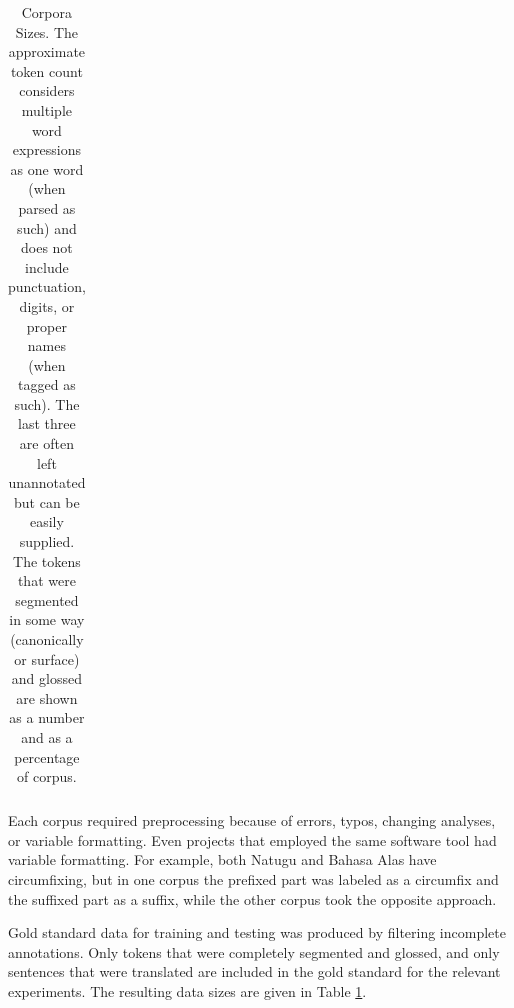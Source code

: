 \begin{table}[hb]
\begin{tabular}{l|r|rc}
    \end{tabular}
    \caption[Corpora Sizes]{Corpora Sizes. The approximate token count considers multiple word expressions as one word (when parsed as such) and does not include punctuation, digits, or proper names (when tagged as such). The last three are often left unannotated but can be easily supplied. The tokens that were segmented in some way (canonically or surface) and glossed are shown as a number and as a percentage of corpus.}
    \label{tab:goldstandard}
\end{table}


Each corpus required preprocessing because of errors, typos, changing analyses, or variable formatting. Even projects that employed the same software tool had variable formatting. For example, both Natugu and Bahasa Alas have circumfixing, but in one corpus the prefixed part was labeled as a circumfix and the suffixed part as a suffix, while the other corpus took the opposite approach. 

Gold standard data for training and testing was produced by filtering incomplete annotations. Only tokens that were completely segmented and glossed, and only sentences that were translated are included in the gold standard for the relevant experiments. The resulting data sizes are given in Table \ref{tab:goldstandard}.

